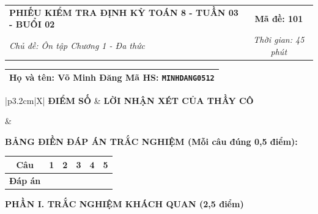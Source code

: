 \documentclass[12pt,a4paper]{article}
\begin{document}
\newpage



\noindent
\begin{tabularx}{\linewidth}{|X|c|}
\hline
\textbf{PHIẾU KIỂM TRA ĐỊNH KỲ TOÁN 8 - TUẦN 03 - BUỔI 02} & \textbf{Mã đề: 101} \\
\textit{Chủ đề: Ôn tập Chương 1 - Đa thức} & \textit{Thời gian: 45 phút} \\
\hline
\end{tabularx}

\vspace{1mm}

\noindent
\begin{tabularx}{\linewidth}{|X|}
\hline
\rule[-2mm]{0pt}{7.5mm}\textbf{Họ và tên:} \textbf{\large Võ Minh Đăng} \hfill \textbf{Mã HS:} \texttt{MINHDANG0512} \quad \\
\hline
\end{tabularx}

\vspace{1mm}

\noindent
\begin{tabularx}{\linewidth}{|p{3.2cm}|X|}
\hline
\centering\textbf{ĐIỂM SỐ} & \centering\textbf{LỜI NHẬN XÉT CỦA THẦY CÔ} \tabularnewline
\hline
\rule{0pt}{1.3cm} & \tabularnewline
\hline
\end{tabularx}

\vspace{1.2mm}

\noindent\textbf{BẢNG ĐIỀN ĐÁP ÁN TRẮC NGHIỆM (Mỗi câu đúng 0,5 điểm):}
\vspace{0.8mm}

\noindent
\renewcommand{\arraystretch}{1.35}
\begin{tabularx}{\linewidth}{|c|*{5}{>{\centering\arraybackslash}X|}}
\hline
\textbf{Câu} & \textbf{1} & \textbf{2} & \textbf{3} & \textbf{4} & \textbf{5} \\
\hline
\textbf{Đáp án} & & & & & \\
\hline
\end{tabularx}
\renewcommand{\arraystretch}{1.0}

\vspace{1.5mm}

\noindent\textbf{\large PHẦN I. TRẮC NGHIỆM KHÁCH QUAN (2,5 điểm)}
\vspace{1mm}
\end{document}
